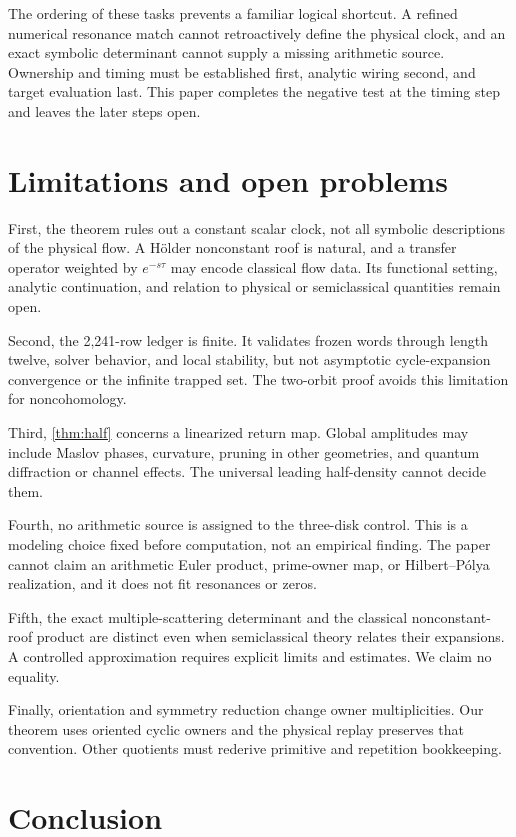 \documentclass[11pt,a4paper]{article}
\theoremstyle{definition}
\theoremstyle{remark}
\begin{document}
The ordering of these tasks prevents a familiar logical shortcut. A refined numerical resonance match cannot retroactively define the physical clock, and an exact symbolic determinant cannot supply a missing arithmetic source. Ownership and timing must be established first, analytic wiring second, and target evaluation last. This paper completes the negative test at the timing step and leaves the later steps open.

\section{Limitations and open problems}

First, the theorem rules out a constant scalar clock, not all symbolic descriptions of the physical flow. A Hölder nonconstant roof is natural, and a transfer operator weighted by \(e^{-s\tau}\) may encode classical flow data. Its functional setting, analytic continuation, and relation to physical or semiclassical quantities remain open.

Second, the 2,241-row ledger is finite. It validates frozen words through length twelve, solver behavior, and local stability, but not asymptotic cycle-expansion convergence or the infinite trapped set. The two-orbit proof avoids this limitation for noncohomology.

Third, \cref{thm:half} concerns a linearized return map. Global amplitudes may include Maslov phases, curvature, pruning in other geometries, and quantum diffraction or channel effects. The universal leading half-density cannot decide them.

Fourth, no arithmetic source is assigned to the three-disk control. This is a modeling choice fixed before computation, not an empirical finding. The paper cannot claim an arithmetic Euler product, prime-owner map, or Hilbert--Pólya realization, and it does not fit resonances or zeros.

Fifth, the exact multiple-scattering determinant and the classical nonconstant-roof product are distinct even when semiclassical theory relates their expansions. A controlled approximation requires explicit limits and estimates. We claim no equality.

Finally, orientation and symmetry reduction change owner multiplicities. Our theorem uses oriented cyclic owners and the physical replay preserves that convention. Other quotients must rederive primitive and repetition bookkeeping.

\section{Conclusion}
\end{document}
